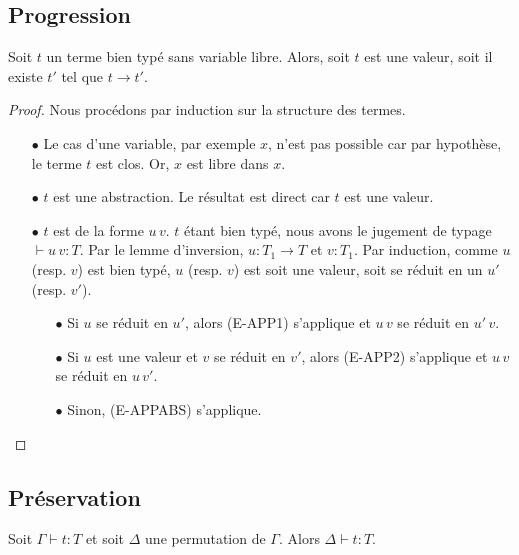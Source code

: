 \subsection*{Progression}

\begin{theorem} [de progression]
  \label{thm:simply-typed-lambda-calculus-progression}
  Soit $t$ un terme bien typé sans variable libre. Alors, soit $t$ est une
  valeur, soit il existe $t'$ tel que $t \rightarrow t'$.
\end{theorem}

\begin{proof}
  \label{proof:simply-typed-lambda-calculus-progression}
  Nous procédons par induction sur la structure des termes.
  \begin{itemize}
    \item[$\bullet$] Le cas d'une variable, par exemple $x$, n'est pas possible car par
      hypothèse, le terme $t$ est clos. Or, $x$ est libre dans $x$.
    \item[$\bullet$] $t$ est une abstraction. Le résultat est direct car $t$ est une valeur.
    \item[$\bullet$] $t$ est de la forme $u \, v$. $t$ étant
      bien typé, nous avons le jugement de typage $\vdash u \, v : T$. Par le lemme
      d'inversion, $u : T_{1} \rightarrow T$ et $v : T_{1}$. Par induction,
      comme $u$ (resp. $v$) est bien typé, $u$ (resp. $v$) est soit une valeur,
      soit se réduit en un $u'$ (resp. $v'$).
      \begin{itemize}
        \item[$\bullet$] Si $u$ se réduit en $u'$, alors (E-APP1) s'applique et $u \, v$
          se réduit en $u' \, v$.
        \item[$\bullet$] Si $u$ est une valeur et $v$ se réduit en $v'$, alors (E-APP2)
          s'applique et $u \, v$ se réduit en $u \, v'$.
        \item[$\bullet$] Sinon, (E-APPABS) s'applique.
      \end{itemize}
  \end{itemize}
\end{proof}

\subsection*{Préservation}

\begin{lemma} [de permutation]
  \label{thm:simply-typed-lambda-calculus-permutation}
  Soit $\Gamma \vdash t : T$ et soit $\Delta$ une permutation de $\Gamma$. Alors
  $\Delta \vdash t : T$.
\end{lemma}

